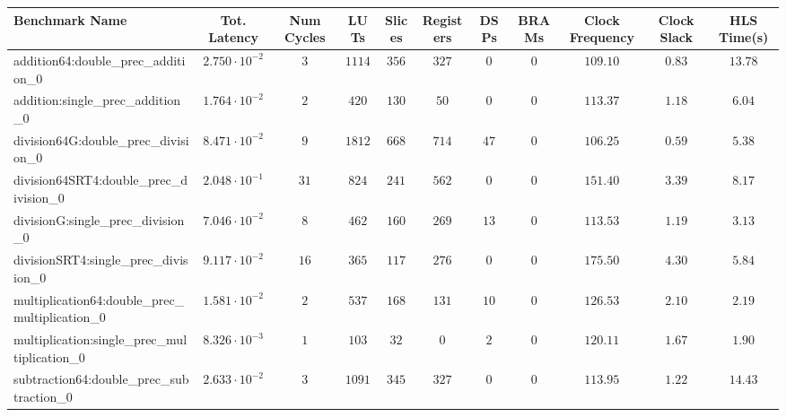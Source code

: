 \begin{tabular}{|l|c|c|c|c|c|c|c|c|c|c|}
\hline
Benchmark Name                                   & Tot. Latency            & Num Cycles & LUTs     & Slices   & Registers & DSPs   & BRAMs & Clock Frequency & Clock Slack & HLS Time(s) \\
\hline
addition64:double\_prec\_addition\_0             & $ 2.750 \cdot 10^{-2} $ & $ 3      $ & $ 1114 $ & $ 356  $ & $ 327   $ & $ 0  $ & $ 0 $ & $ 109.10      $ & $ 0.83    $ & $ 13.78   $ \\
addition:single\_prec\_addition\_0               & $ 1.764 \cdot 10^{-2} $ & $ 2      $ & $ 420  $ & $ 130  $ & $ 50    $ & $ 0  $ & $ 0 $ & $ 113.37      $ & $ 1.18    $ & $ 6.04    $ \\
division64G:double\_prec\_division\_0            & $ 8.471 \cdot 10^{-2} $ & $ 9      $ & $ 1812 $ & $ 668  $ & $ 714   $ & $ 47 $ & $ 0 $ & $ 106.25      $ & $ 0.59    $ & $ 5.38    $ \\
division64SRT4:double\_prec\_division\_0         & $ 2.048 \cdot 10^{-1} $ & $ 31     $ & $ 824  $ & $ 241  $ & $ 562   $ & $ 0  $ & $ 0 $ & $ 151.40      $ & $ 3.39    $ & $ 8.17    $ \\
divisionG:single\_prec\_division\_0              & $ 7.046 \cdot 10^{-2} $ & $ 8      $ & $ 462  $ & $ 160  $ & $ 269   $ & $ 13 $ & $ 0 $ & $ 113.53      $ & $ 1.19    $ & $ 3.13    $ \\
divisionSRT4:single\_prec\_division\_0           & $ 9.117 \cdot 10^{-2} $ & $ 16     $ & $ 365  $ & $ 117  $ & $ 276   $ & $ 0  $ & $ 0 $ & $ 175.50      $ & $ 4.30    $ & $ 5.84    $ \\
multiplication64:double\_prec\_multiplication\_0 & $ 1.581 \cdot 10^{-2} $ & $ 2      $ & $ 537  $ & $ 168  $ & $ 131   $ & $ 10 $ & $ 0 $ & $ 126.53      $ & $ 2.10    $ & $ 2.19    $ \\
multiplication:single\_prec\_multiplication\_0   & $ 8.326 \cdot 10^{-3} $ & $ 1      $ & $ 103  $ & $ 32   $ & $ 0     $ & $ 2  $ & $ 0 $ & $ 120.11      $ & $ 1.67    $ & $ 1.90    $ \\
subtraction64:double\_prec\_subtraction\_0       & $ 2.633 \cdot 10^{-2} $ & $ 3      $ & $ 1091 $ & $ 345  $ & $ 327   $ & $ 0  $ & $ 0 $ & $ 113.95      $ & $ 1.22    $ & $ 14.43   $ \\

\end{tabular}
